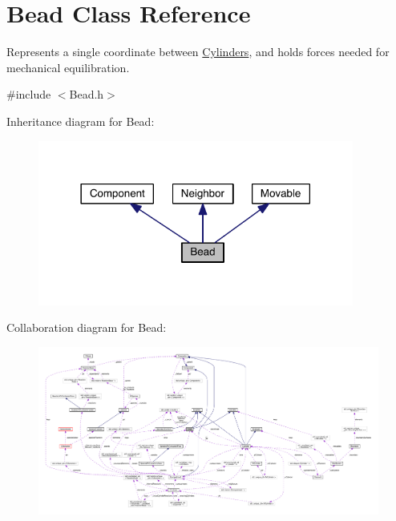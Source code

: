 \hypertarget{classBead}{\section{Bead Class Reference}
\label{classBead}
}


Represents a single coordinate between \hyperlink{classCylinder}{Cylinders}, and holds forces needed for mechanical equilibration.  




{\ttfamily \#include $<$Bead.\+h$>$}



Inheritance diagram for Bead\+:\nopagebreak
\begin{figure}[H]
\begin{center}
\leavevmode
\includegraphics[width=294pt]{classBead__inherit__graph}
\end{center}
\end{figure}


Collaboration diagram for Bead\+:\nopagebreak
\begin{figure}[H]
\begin{center}
\leavevmode
\includegraphics[width=350pt]{classBead__coll__graph}
\end{center}
\end{figure}
